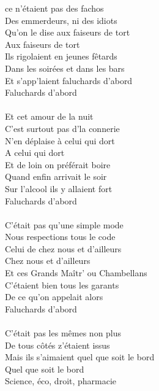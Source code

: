 
 ce n'étaient pas des fachos
\\Des emmerdeurs, ni des idiots
\\Qu'on le dise aux faiseurs de tort
\\Aux faiseurs de tort
\\Ils rigolaient en jeunes fêtards
\\Dans les soirées et dans les bars
\\Et s'app'laient faluchards d'abord
\\Faluchards d'abord
\\\\Et cet amour de la nuit
\\C'est surtout pas d'la connerie
\\N'en déplaise à celui qui dort
\\A celui qui dort
\\Et de loin on préférait boire
\\Quand enfin arrivait le soir
\\Sur l'alcool ils y allaient fort
\\Faluchards d'abord
\\\\C'était pas qu'une simple mode
\\Nous respections tous le code
\\Celui de chez nous et d'ailleurs
\\Chez nous et d'ailleurs
\\Et ces Grands Maîtr' ou Chambellans
\\C'étaient bien tous les garants
\\De ce qu'on appelait alors
\\Faluchards d'abord
\\\\C'était pas les mêmes non plus
\\De tous côtés z'étaient issus
\\Mais ils s'aimaient quel que soit le bord
\\Quel que soit le bord
\\Science, éco, droit, pharmacie

